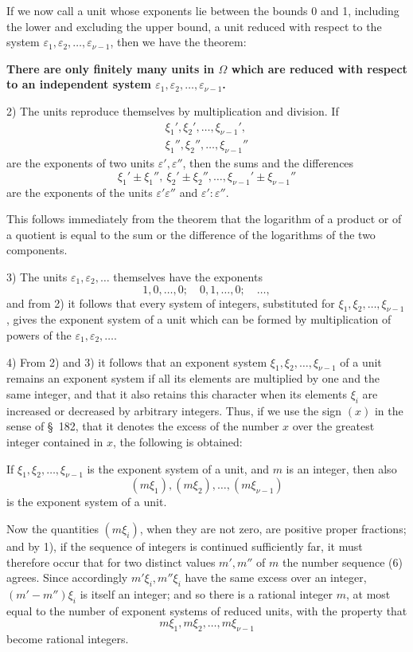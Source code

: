 \documentclass[11pt]{article}
\begin{document}
If we now call a unit whose exponents lie between the bounds 0 and 1, including the lower and excluding the upper bound, a unit reduced with respect to the system $\varepsilon_1,\varepsilon_2,\ldots,\varepsilon_{\nu-1}$, then we have the theorem:

\textbf{There are only finitely many units in $\Omega$ which are reduced with respect to an independent system $\varepsilon_1,\varepsilon_2,\ldots,\varepsilon_{\nu-1}$.}

2) The units reproduce themselves by multiplication and division. If
\[
\begin{array}{c}
\xi_1',\xi_2',\ldots,\xi_{\nu-1}',\\
\xi_1'',\xi_2'',\ldots,\xi_{\nu-1}''
\end{array}
\]
are the exponents of two units $\varepsilon',\varepsilon''$, then the sums and the differences
\[
\xi_1'\pm\xi_1'',\ \xi_2'\pm\xi_2'',\ldots,\xi_{\nu-1}'\pm\xi_{\nu-1}''
\]
are the exponents of the units $\varepsilon'\varepsilon''$ and $\varepsilon':\varepsilon''$.

This follows immediately from the theorem that the logarithm of a product or of a quotient is equal to the sum or the difference of the logarithms of the two components.

3) The units $\varepsilon_1,\varepsilon_2,\ldots$ themselves have the exponents
\[
1,0,\ldots,0;\quad 0,1,\ldots,0;\quad\ldots,
\]
and from 2) it follows that every system of integers, substituted for $\xi_1,\xi_2,\ldots,\xi_{\nu-1}$, gives the exponent system of a unit which can be formed by multiplication of powers of the $\varepsilon_1,\varepsilon_2,\ldots$.

4) From 2) and 3) it follows that an exponent system $\xi_1,\xi_2,\ldots,\xi_{\nu-1}$ of a unit remains an exponent system if all its elements are multiplied by one and the same integer, and that it also retains this character when its elements $\xi_i$ are increased or decreased by arbitrary integers. Thus, if we use the sign $(x)$ in the sense of \S~182, that it denotes the excess
of the number $x$ over the greatest integer contained in $x$, the following is obtained:

If $\xi_1,\xi_2,\ldots,\xi_{\nu-1}$ is the exponent system of a unit, and $m$ is an integer, then also
\begin{equation}
(m\xi_1),(m\xi_2),\ldots,(m\xi_{\nu-1})
\tag{6}
\end{equation}
is the exponent system of a unit.

Now the quantities $(m\xi_i)$, when they are not zero, are positive proper fractions; and by 1), if the sequence of integers is continued sufficiently far, it must therefore occur that for two distinct values $m',m''$ of $m$ the number sequence (6) agrees. Since accordingly $m'\xi_i,m''\xi_i$ have the same excess over an integer, $(m'-m'')\xi_i$ is itself an integer; and so there is a rational integer $m$, at most equal to the number of exponent systems of reduced units, with the property that
\[
m\xi_1,m\xi_2,\ldots,m\xi_{\nu-1}
\]
become rational integers.
\end{document}
